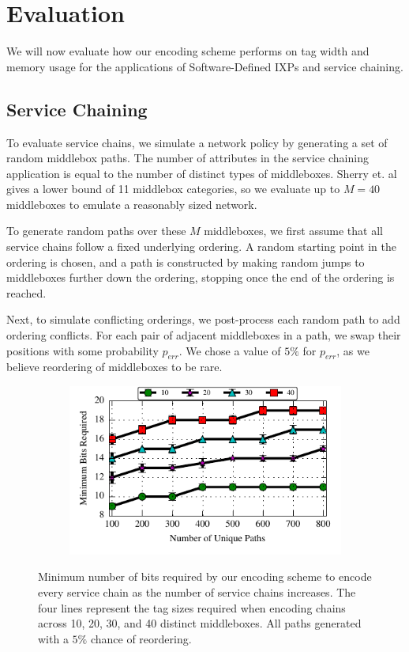 \section{Evaluation} \label{sec:evaluation}
We will now evaluate how our encoding scheme performs on tag width and memory usage for the applications of Software-Defined IXPs and service chaining.

\subsection{Service Chaining}

To evaluate service chains, we simulate a network policy by generating a set of random middlebox paths. The number of attributes in the service chaining application is equal to the number of distinct types of middleboxes. Sherry et. al~\cite{Sherry:2012} gives a lower bound of 11 middlebox categories, so we evaluate up to $M = 40$ middleboxes to emulate a reasonably sized network. 

To generate random paths over these $M$ middleboxes, we first assume that all service chains follow a fixed underlying ordering. A random starting point in the ordering is chosen, and a path is constructed by making random jumps to middleboxes further down the ordering, stopping once the end of the ordering is reached.

Next, to simulate conflicting orderings, we post-process each random path to add ordering conflicts. For each pair of adjacent middleboxes in a path, we swap their positions with some probability $p_{err}$. We chose a value of $5\%$ for $p_{err}$, as we believe reordering of middleboxes to be rare. 

\begin{figure}[t!] 
\begin{minipage}{1\linewidth}
\begin{subfigure}[b]{0.96\linewidth}
\includegraphics[width=\linewidth]{figures/service_chaining_minbits}
\end{subfigure} 
\end{minipage} 
\caption{Minimum number of bits required by our encoding scheme to encode every service chain as the number of service chains increases. The four lines represent the tag sizes required when encoding chains across 10, 20, 30, and 40 distinct middleboxes. All paths generated with a $5\%$ chance of reordering.}
\label{fig:chain_bits}
\end{figure}

